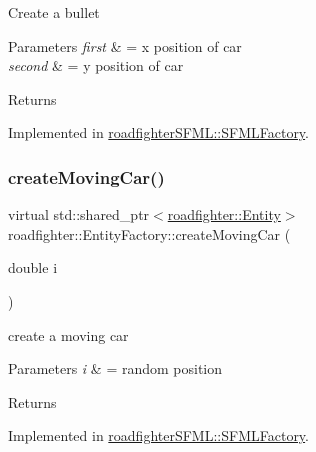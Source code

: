 Create a bullet 
\begin{DoxyParams}{Parameters}
{\em first} & = x position of car \\
\hline
{\em second} & = y position of car \\
\hline
\end{DoxyParams}
\begin{DoxyReturn}{Returns}

\end{DoxyReturn}


Implemented in \hyperlink{classroadfighterSFML_1_1SFMLFactory_aac2ed62453b201da7d124947b6cd475b}{roadfighter\+S\+F\+M\+L\+::\+S\+F\+M\+L\+Factory}.

\mbox{\label{classroadfighter_1_1EntityFactory_a53cc68cc3f7365e4ded258ea9b281b45}} 
\subsubsection{\texorpdfstring{create\+Moving\+Car()}{createMovingCar()}}
{\footnotesize\ttfamily virtual std\+::shared\+\_\+ptr$<$\hyperlink{classroadfighter_1_1Entity}{roadfighter\+::\+Entity}$>$ roadfighter\+::\+Entity\+Factory\+::create\+Moving\+Car (\begin{DoxyParamCaption}\item[{double}]{i }\end{DoxyParamCaption})\hspace{0.3cm}{\ttfamily [pure virtual]}}

create a moving car 
\begin{DoxyParams}{Parameters}
{\em i} & = random position \\
\hline
\end{DoxyParams}
\begin{DoxyReturn}{Returns}

\end{DoxyReturn}


Implemented in \hyperlink{classroadfighterSFML_1_1SFMLFactory_aa1aeba2d2613b784d9da5f6fd3109154}{roadfighter\+S\+F\+M\+L\+::\+S\+F\+M\+L\+Factory}.

\mbox{\label{classroadfighter_1_1EntityFactory_ab318794f4effc0c2195fae5da267d900}} 

